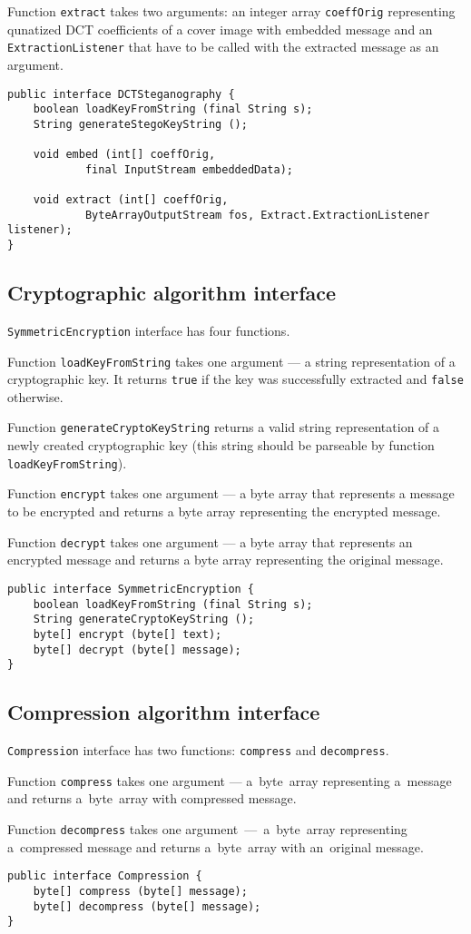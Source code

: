 Function \texttt{extract} takes two arguments: an integer array \texttt{coeffOrig}
representing qunatized DCT coefficients of a cover image with embedded message
and an \texttt{ExtractionListener} that have to be called with the extracted message
as an argument.

\begin{lstlisting} 
public interface DCTSteganography {
    boolean loadKeyFromString (final String s);
    String generateStegoKeyString ();

    void embed (int[] coeffOrig, 
            final InputStream embeddedData);

    void extract (int[] coeffOrig,  
            ByteArrayOutputStream fos, Extract.ExtractionListener listener);
}
\end{lstlisting}

\subsection{Cryptographic algorithm interface}
\texttt{SymmetricEncryption} interface has four functions.

Function \texttt{loadKeyFromString} takes one argument --- 
a string representation of a cryptographic key. It returns
\texttt{true} if the key was successfully extracted and
\texttt{false} otherwise.

Function \texttt{generateCryptoKeyString} returns a 
valid string representation of a newly created cryptographic key 
(this string should be parseable by function \texttt{loadKeyFromString}).

Function \texttt{encrypt} takes one argument --- a byte array that represents
a message to be encrypted and returns a byte array representing the encrypted
message.

Function \texttt{decrypt} takes one argument --- a byte array that represents
an encrypted message and returns a byte array representing the original message.

\begin{lstlisting} 
public interface SymmetricEncryption {
    boolean loadKeyFromString (final String s);
    String generateCryptoKeyString ();
    byte[] encrypt (byte[] text);
    byte[] decrypt (byte[] message);
}
\end{lstlisting}

\subsection{Compression algorithm interface}

\texttt{Compression} interface has two functions:
\texttt{compress} and \texttt{decompress}. 

Function \texttt{compress}
takes one argument --- a~byte~array representing a~message and returns
a~byte~array with compressed message. 

Function \texttt{decompress}
takes one argument~---~a~byte~array representing a~compressed message
and returns a~byte~array with an~original message.

\begin{lstlisting} 
public interface Compression {
    byte[] compress (byte[] message);
    byte[] decompress (byte[] message);
}
\end{lstlisting}
